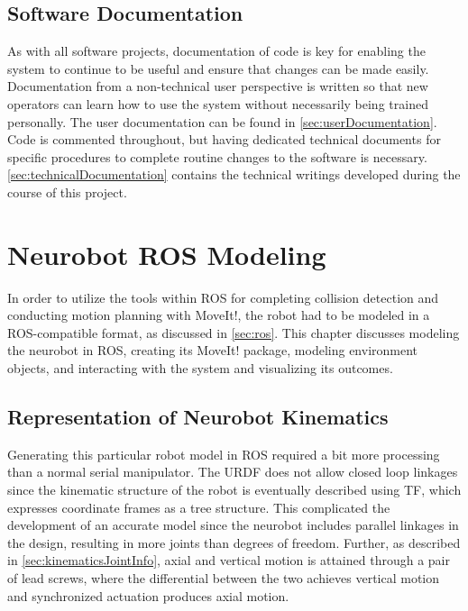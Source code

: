 \documentclass[12pt]{report}
\makeatletter
\renewcommand{\todo}[2][]{%
    \@todo[caption={#2}, #1]{\begin{spacing}{0.5}#2\end{spacing}}%
}
\makeatother
\begin{document}
\section{Software Documentation}
As with all software projects, documentation of code is key for enabling the system to continue to be useful and ensure that changes can be made easily. Documentation from a non-technical user perspective is written so that new operators can learn how to use the system without necessarily being trained personally. The user documentation can be found in \autoref{sec:userDocumentation}. Code is commented throughout, but having dedicated technical documents for specific procedures to complete routine changes to the software is necessary. \autoref{sec:technicalDocumentation} contains the technical writings developed during the course of this project.


\chapter{Neurobot ROS Modeling}
In order to utilize the tools within ROS for completing collision detection and conducting motion planning with MoveIt!, the robot had to be modeled in a ROS-compatible format, as discussed in \autoref{sec:ros}. This chapter discusses modeling the neurobot in ROS, creating its MoveIt! package, modeling environment objects, and interacting with the system and visualizing its outcomes.


\section{Representation of Neurobot Kinematics}
Generating this particular robot model in ROS required a bit more processing than a normal serial manipulator. The URDF does not allow closed loop linkages since the kinematic structure of the robot is eventually described using TF, which expresses coordinate frames as a tree structure. This complicated the development of an accurate model since the neurobot includes parallel linkages in the design, resulting in more joints than degrees of freedom. Further, as described in \autoref{sec:kinematicsJointInfo}, axial and vertical motion is attained through a pair of lead screws, where the differential between the two achieves vertical motion and synchronized actuation produces axial motion. 

\todo[inline]{DH parameters for the modeled robot.}
\end{document}
